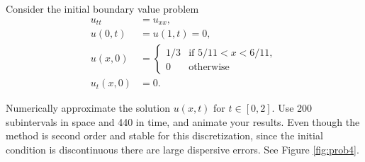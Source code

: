 \begin{problem}
\label{prob:prob4}
Consider the initial boundary value problem
\begin{align*}
	u_{tt} &= u_{xx}, \\
	u(0,t) &= u(1,t) = 0, \\
	u(x,0) &= \begin{cases} 1/3 & \text{if } 5/11 < x < 6/11,\\
	0 & \text{otherwise}
	\end{cases}\\
	u_t(x,0) &= 0.
\end{align*}

Numerically approximate the solution $u(x,t)$ for $t \in \left[0, 2\right]$.
Use 200 subintervals in space and 440 in time, and animate your results.
Even though the method is second order and stable for this discretization, since the initial condition is discontinuous there are large dispersive errors.
See Figure \ref{fig:prob4}.



\end{problem}
